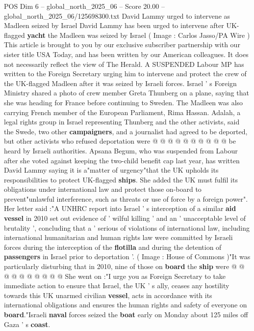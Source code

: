 \begin{textsample}{POS Dim 6 – global\_north\_2025\_06 – Score 20.00 – global\_north\_2025\_06/125698300.txt}  \label{ex:f6_pos_023}
David Lammy urged to intervene as Madleen seized by Israel David Lammy has been urged to intervene after UK-flagged \textbf{yacht} the Madleen was seized by Israel ( Image : Carlos Jasso/PA Wire ) This article is brought to you by our exclusive subscriber partnership with our sister title USA Today, and has been written by our American colleagues.
It does not necessarily reflect the view of The Herald.
A SUSPENDED Labour MP has written to the Foreign Secretary urging him to intervene and protect the crew of the UK-flagged Madleen after it was seized by Israeli forces.
Israel ' s Foreign Ministry shared a photo of crew member Greta Thunberg on a plane, saying that she was heading for France before continuing to Sweden.
The Madleen was also carrying French member of the European Parliament, Rima Hassan.
Adalah, a legal rights group in Israel representing Thunberg and the other activists, said the Swede, two other \textbf{campaigners}, and a journalist had agreed to be deported, but other activists who refused deportation were @ @ @ @ @ @ @ @ @ @ be heard by Israeli authorities.
Apsana Begum, who was suspended from Labour after she voted against keeping the two-child benefit cap last year, has written David Lammy saying it is a"matter of urgency"that the UK upholds its responsibilities to protect UK-flagged \textbf{ships}.
She added the UK must fulfil its obligations under international law and protect those on-board to prevent"unlawful interference, such as threats or use of force by a foreign power".
Her letter said :"A UNHRC report into Israel ' s interception of a similar \textbf{aid} \textbf{vessel} in 2010 set out evidence of ' wilful killing ' and an ' unacceptable level of brutality ', concluding that a ' serious of violations of international law, including international humanitarian and human rights law were committed by Israeli forces during the interception of the \textbf{flotilla} and during the detention of \textbf{passengers} in Israel prior to deportation '. ( Image : House of Commons )"It was particularly disturbing that in 2010, nine of those on \textbf{board} the \textbf{ship} were @ @ @ @ @ @ @ @ @ @ She went on :"I urge you as Foreign Secretary to take immediate action to ensure that Israel, the UK ' s ally, ceases any hostility towards this UK unarmed civilian \textbf{vessel}, acts in accordance with its international obligations and ensures the human rights and safety of everyone on \textbf{board}."Israeli \textbf{naval} forces seized the \textbf{boat} early on Monday about 125 miles off Gaza ' s \textbf{coast}.

\end{textsample}
